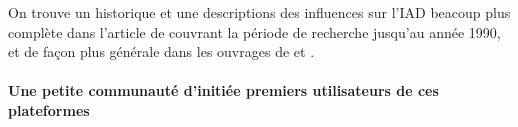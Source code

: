 On trouve un historique et une descriptions des influences sur l'IAD beacoup plus complète dans l'article de \textcite{Bond1988} couvrant la période de recherche jusqu'au année 1990, et de façon plus générale dans les ouvrages de \textcite{Wooldridge2009} et \textcite{Ferber1995}.








\paragraph{Une petite communauté d'initiée premiers utilisateurs de ces plateformes}

